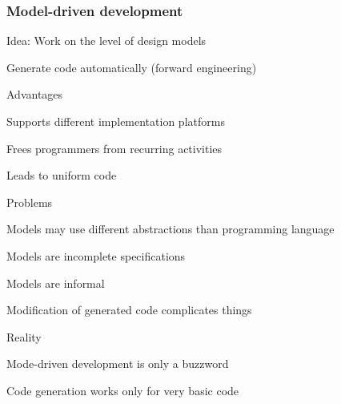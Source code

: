 \subsubsection{Model-driven development}
\enumstart
	\item Idea: Work on the level of design models
	\item Generate code automatically (forward engineering)
	\item Advantages
	\enumstart
		\item Supports different implementation platforms
		\item Frees programmers from recurring activities
		\item Leads to uniform code
	\enumend
	\item Problems
	\enumstart
		\item Models may use different abstractions than programming language
		\item Models are incomplete specifications
		\item Models are informal
		\item Modification of generated code complicates things
	\enumend
	\item Reality
	\enumstart
		\item Mode-driven development is only a buzzword
		\item Code generation works only for very basic code
	\enumend
\enumend
